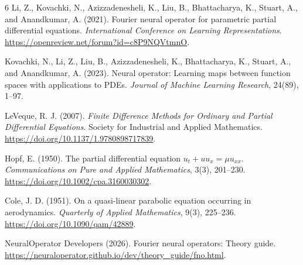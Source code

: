 \documentclass{article}
\begin{document}
\begin{thebibliography}{6}
Li, Z., Kovachki, N., Azizzadenesheli, K., Liu, B., Bhattacharya, K.,
Stuart, A., and Anandkumar, A. (2021).
Fourier neural operator for parametric partial differential equations.
\emph{International Conference on Learning Representations}.
\url{https://openreview.net/forum?id=c8P9NQVtmnO}.

Kovachki, N., Li, Z., Liu, B., Azizzadenesheli, K., Bhattacharya, K.,
Stuart, A., and Anandkumar, A. (2023).
Neural operator: Learning maps between function spaces with applications to PDEs.
\emph{Journal of Machine Learning Research}, 24(89), 1--97.

LeVeque, R. J. (2007).
\emph{Finite Difference Methods for Ordinary and Partial Differential Equations}.
Society for Industrial and Applied Mathematics.
\url{https://doi.org/10.1137/1.9780898717839}.

Hopf, E. (1950).
The partial differential equation $u_t+uu_x=\mu u_{xx}$.
\emph{Communications on Pure and Applied Mathematics}, 3(3), 201--230.
\url{https://doi.org/10.1002/cpa.3160030302}.

Cole, J. D. (1951).
On a quasi-linear parabolic equation occurring in aerodynamics.
\emph{Quarterly of Applied Mathematics}, 9(3), 225--236.
\url{https://doi.org/10.1090/qam/42889}.

NeuralOperator Developers (2026).
Fourier neural operators: Theory guide.
\url{https://neuraloperator.github.io/dev/theory_guide/fno.html}.
\end{thebibliography}
\end{document}
